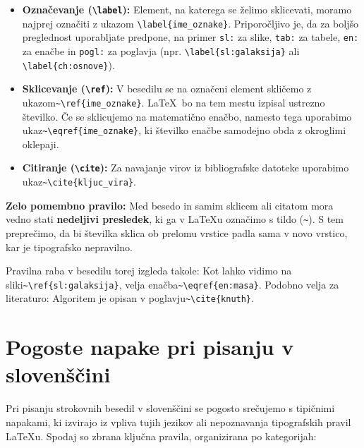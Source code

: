 \documentclass[a4paper,12pt,openright]{book}
\begin{document}
\begin{itemize}
    \item \textbf{Označevanje (\texttt{\textbackslash label}):} Element, na katerega se želimo sklicevati, moramo najprej označiti z ukazom \verb|\label{ime_oznake}|. Priporočljivo je, da za boljšo preglednost uporabljate predpone, na primer \texttt{sl:} za slike, \texttt{tab:} za tabele, \texttt{en:} za enačbe in \texttt{pogl:} za poglavja (npr. \verb|\label{sl:galaksija}| ali \verb|\label{ch:osnove}|).
    
    \item \textbf{Sklicevanje (\texttt{\textbackslash ref}):} V besedilu se na označeni element skličemo z ukazom\verb|~\ref{ime_oznake}|. \LaTeX\ bo na tem mestu izpisal ustrezno številko. Če se sklicujemo na matematično enačbo, namesto tega uporabimo ukaz\verb|~\eqref{ime_oznake}|, ki številko enačbe samodejno obda z okroglimi oklepaji.
    
    \item \textbf{Citiranje (\texttt{\textbackslash cite}):} Za navajanje virov iz bibliografske datoteke uporabimo ukaz\verb|~\cite{kljuc_vira}|.
\end{itemize}

\textbf{Zelo pomembno pravilo:} Med besedo in samim sklicem ali citatom mora vedno stati \textbf{nedeljivi presledek}, ki ga v \LaTeX u označimo s tildo (\verb|~|). S tem preprečimo, da bi številka sklica ob prelomu vrstice padla sama v novo vrstico, kar je tipografsko nepravilno. 

Pravilna raba v besedilu torej izgleda takole: 
Kot lahko vidimo na sliki\verb|~\ref{sl:galaksija}|, velja enačba\verb|~\eqref{en:masa}|. 
Podobno velja za literaturo: Algoritem je opisan v poglavju\verb|~\cite{knuth}|.

\chapter{Pogoste napake pri pisanju v slovenščini}
\label{ch:slo}

Pri pisanju strokovnih besedil v slovenščini se pogosto srečujemo s tipičnimi napakami, ki izvirajo iz vpliva tujih jezikov ali nepoznavanja tipografskih pravil \LaTeX u. Spodaj so zbrana ključna pravila, organizirana po kategorijah:
\end{document}
